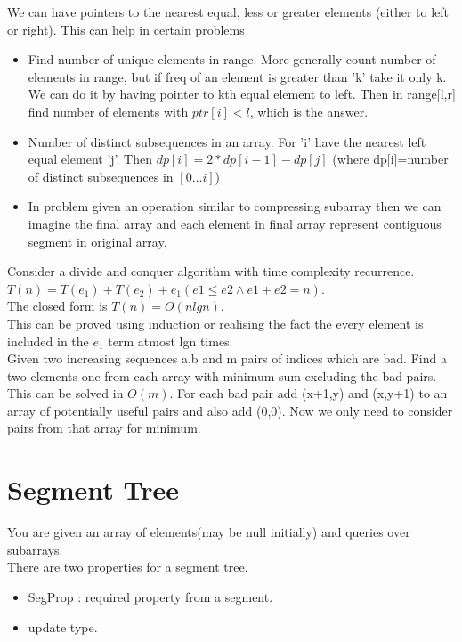 \documentclass[../Notes.tex]{subfiles}
\begin{document}
We can have pointers to the nearest equal, less or greater elements (either to left or right). This can help in certain problems
\begin{itemize}
	\item Find number of unique elements in range. More generally count number of elements in range, but if freq of an element is greater than 'k' take it only k.\\
	We can do it by having pointer to kth equal element to left. Then in range[l,r] find number of elements with $ptr[i]<l$, which is the answer.
	\item Number of distinct subsequences in an array. For 'i' have the nearest left equal element 'j'. Then $dp[i]=2*dp[i-1]-dp[j]$ (where dp[i]=number of distinct subsequences in $[0\ldots i]$)
	\item In problem given an operation similar to compressing subarray then we can imagine the final array and each element in final array represent contiguous segment in original array. 
\end{itemize}

Consider a divide and conquer algorithm with time complexity recurrence.
$T(n)=T(e_1)+T(e_2)+e_1 (e1\leq e2 \wedge e1+e2=n)$.\\ 
The closed form is $T(n) = O(nlgn)$.\\
This can be proved using induction or realising the fact the every element is included in the $e_1$ term atmost lgn times.\\

Given two increasing sequences a,b and m pairs of indices which are bad. Find a two elements one from each array with minimum sum excluding the bad pairs. This can be solved in $O(m)$. For each bad pair add (x+1,y) and (x,y+1) to an array of potentially useful pairs and also add (0,0). Now we only need to consider pairs from that array for minimum.

\section{Segment Tree}
You are given an array of elements(may be null initially) and queries over subarrays.\\
There are two properties for a segment tree.
\begin{itemize}
	\item SegProp : required property from a segment.
	\item update type.
\end{itemize}
\end{document}
